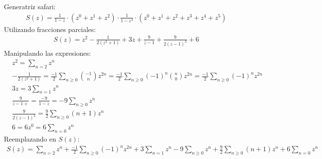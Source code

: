 \documentclass[spanish, fleqn]{article}
\begin{document}
	Generatriz safari:
	\begin{align*}
	S(z)=\frac{1}{1-z} \cdot (z^0+z^1+z^2) \cdot \frac{1}{1-z^4} \cdot (z^0+z^1+z^2+z^3+z^4+z^5) 
	\end{align*}	
	Utilizando fracciones parciales:
	\begin{align*}
	S(z)= z^2-\frac{1}{2(z^2+1)}+3z+\frac{9}{z-1}+\frac{9}{2(z-1)^2}+6
	\end{align*}
	Manipulando las expresiones:
	\begin{align*}
	&z^2=\sum_{n=2} z^n\\
	&-\frac{1}{2(z^2+1)}=\frac{-1}{2}\sum_{n \geqslant 0} \binom{-1}{n}z^{2n}=\frac{-1}{2}\sum_{n\geqslant 0} (-1)^n\binom{n}{0}z^{2n}=\frac{-1}{2}\sum_{n\geqslant 0}(-1)^nz^{2n}\\
	&3z=3\sum_{n=1} z^n\\
	&\frac{9}{z-1+}=\frac{-9}{1-z}=-9\sum_{n \geqslant 0} z^n\\
	&\frac{9}{2(z-1)^2}=\frac{9}{2}\sum_{n \geqslant 0} (n+1)z^n\\
	&6=6z^0=6\sum_{n=0}z^n
	\end{align*}
	Reemplazando en $S(z)$:
	\begin{align*}
	S(z)=\sum_{n=2} z^n+\frac{-1}{2}\sum_{n {}\geqslant 0} (-1)^nz^{2n}+3\sum_{n=1} z^n-9\sum_{n \geqslant 0} z^n+\frac{9}{2}\sum_{n \geqslant 0} (n+1)z^n+6\sum_{n=0}z^n
	\end{align*}
\end{document}
